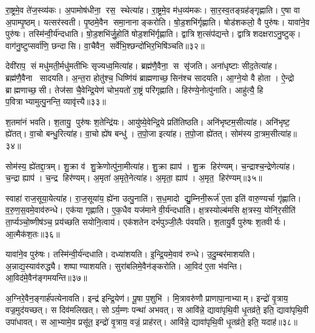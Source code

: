 रा॒ष्ट्रमे॒व ते॑ज॒स्व्य॑कः। अ॒पामोष॑धीना॒ रस॒ स्थेत्या॑ह। रा॒ष्ट्रमे॒व म॑ध॒व्य॑मकः। सा॒र॒स्व॒तङ्ग्रह॑ङ्गृह्णाति। ए॒षा वा अ॒पाम्पृ॒ष्ठम्। यत्सर॑स्वती। पृ॒ष्ठमे॒वैन समा॒नानाङ्करोति। षो॒ड॒शभि॑र्गृह्णाति। षोड॑शकलो॒ वै पुरु॑षः। यावा॑ने॒व पुरु॑षः। तस्मि॑न्वी॒र्य॑न्दधाति। षो॒ड॒शभि॑र्जु॒होति॑ षोड॒शभि॑र्गृह्णाति। द्वात्रिश॒त्संप॑द्यन्ते। द्वात्रिशदक्षराऽनु॒ष्टुक्। वाग॑नु॒ष्टुप्सर्वा॑णि॒ छन्दासि। वा॒चैवैन॒ सर्वे॑भि॒श्छन्दो॑भिर॒भिषि॑ञ्चति॥३२॥\anuvakamend[ऊ॒र्मिरित्या॑ह॒ सूर्य॑वर्चस॒ स्थेत्या॑ह ब्रह्मवर्च॒स्य॑कस्तेज॒स्या स्थेत्या॑है॒व पुरु॑ष॒ष्षट् च॑]

देवी॑राप॒ सं मधु॑मती॒र्मधु॑मतीभिः सृज्यध्व॒मित्या॑ह। ब्रह्म॑णै॒वैना॒ स सृ॑जति। अना॑धृष्टाः सीद॒तेत्या॑ह। ब्रह्म॑णै॒वैना सादयति। अ॒न्त॒रा होतु॑श्च॒ धिष्णि॑यं ब्राह्मणाच्छ॒सिन॑श्च सादयति। आ॒ग्ने॒यो वै होता। ऐ॒न्द्रो ब्राह्मणाच्छ॒सी। तेज॑सा चै॒वेन्द्रि॒येण॑ चोभ॒यतो॑ रा॒ष्ट्रं परि॑गृह्णाति। हिर॑ण्ये॒नोत्पु॑नाति। आहु॑त्यै॒ हि प॒वित्राभ्यामुत्पु॒नन्ति॒ व्यावृ॑त्त्यै॥३३॥

श॒तमा॑नं भवति। श॒तायु॒ पुरु॑षः श॒तेन्द्रि॑यः। आयु॑ष्ये॒वेन्द्रि॒ये प्रति॑तिष्ठति। अनि॑भृष्टम॒सीत्या॑ह। अनि॑भृष्ट॒ ह्ये॑तत्। वा॒चो बन्धु॒रित्या॑ह। वा॒चो ह्ये॑ष बन्धु॑। त॒पो॒जा इत्या॑ह। त॒पो॒जा ह्ये॑तत्। सोम॑स्य दा॒त्रम॒सीत्या॑ह॥३४॥

सोम॑स्य॒ ह्ये॑तद्दा॒त्रम्। शु॒क्रा व॑ शु॒क्रेणोत्पु॑ना॒मीत्या॑ह। शु॒क्रा ह्याप॑। शु॒क्र हिर॑ण्यम्। च॒न्द्राश्च॒न्द्रेणेत्या॑ह। च॒न्द्रा ह्याप॑। च॒न्द्र हिर॑ण्यम्। अ॒मृता॑ अ॒मृते॒नेत्या॑ह। अ॒मृता॒ ह्याप॑। अ॒मृत॒ हिर॑ण्यम्॥३५॥

स्वाहा॑ राज॒सूया॒येत्या॑ह। रा॒ज॒सूया॑य॒ ह्ये॑ना उत्पु॒नाति॑। स॒ध॒मादो द्यु॒म्निनी॒रूर्ज॑ ए॒ता इति॑ वारु॒ण्यर्चा गृ॑ह्णाति। व॒रु॒ण॒स॒वमे॒वाव॑रुन्धे। एक॑या गृह्णाति। ए॒क॒धैव यज॑माने वी॒र्य॑न्दधाति। क्ष॒त्रस्योल्ब॑मसि क्ष॒त्रस्य॒ योनि॑र॒सीति॑ ता॒र्प्यञ्चो॒ष्णीष॑ञ्च॒ प्रय॑च्छति सयोनि॒त्वाय॑। एक॑शतेन दर्भपुञ्जी॒लैः प॑वयति। श॒तायु॒र्वै पुरु॑षः श॒तवीर्यः। आ॒त्मैक॑श॒तः॥३६॥

यावा॑ने॒व पुरु॑षः। तस्मि॑न्वी॒र्य॑न्दधाति। दध्या॑शयति। इ॒न्द्रि॒यमे॒वाव॑ रुन्धे। उ॒दु॒म्बर॑माशयति। अ॒न्नाद्य॒स्याव॑रुद्ध्यै। शष्पाण्याशयति। सुरा॑बलिमे॒वैन॑ङ्करोति। आ॒विद॑ ए॒ता भ॑वन्ति। आ॒विद॑मे॒वैन॑ङ्गमयन्ति॥३७॥

अ॒ग्निरे॒वैन॒ङ्गार्\mbox{}ह॑पत्येनावति। इन्द्र॑ इन्द्रि॒येण॑। पू॒षा प॒शुभि॑। मि॒त्रावरु॑णौ प्राणापा॒नाभ्याम्। इन्द्रो॑ वृ॒त्राय॒ वज्र॒मुद॑यच्छत्। स दिव॑मलिखत्। सोऽर्य॒म्णः पन्था॑ अभवत्। स आवि॑न्ने॒ द्यावा॑पृथि॒वी धृ॒तव्र॑ते॒ इति॒ द्यावा॑पृथि॒वी उपा॑धावत्। स आ॒भ्यामे॒व प्रसू॑त॒ इन्द्रो॑ वृ॒त्राय॒ वज्रं॒ प्राह॑रत्। आवि॑न्ने॒ द्यावा॑पृथि॒वी धृ॒तव्र॑ते॒ इति॒ यदाह॑॥३८॥

